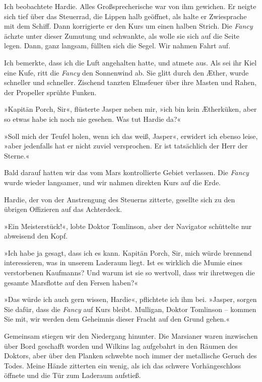 Ich beobachtete Hardie. Alles Großsprecherische war von ihm
gewichen. Er neigte sich tief über das Steuerrad, die Lippen halb
geöffnet, als halte er Zwiesprache mit dem Schiff. Dann korrigierte
er den Kurs um einen halben Strich. Die \emph{Fancy} ächzte unter
dieser Zumutung und schwankte, als wolle sie sich auf die Seite
legen. Dann, ganz langsam, füllten sich die Segel. Wir nahmen Fahrt
auf.

Ich bemerkte, dass ich die Luft angehalten hatte, und atmete aus.
Als sei ihr Kiel eine Kufe, ritt die \emph{Fancy} den Sonnenwind
ab. Sie glitt durch den Æther, wurde schneller und schneller.
Zischend tanzten Elmsfeuer über ihre Masten und Rahen, der
Propeller sprühte Funken.

»Kapitän Porch, Sir«, flüsterte Jasper neben mir, »ich bin kein
Ætherküken, aber so etwas habe ich noch nie gesehen. Was tut Hardie
da?«

»Soll mich der Teufel holen, wenn ich das weiß, Jasper«, erwidert
ich ebenso leise, »aber jedenfalls hat er nicht zuviel versprochen.
Er ist tatsächlich der Herr der Sterne.«

\bigpar

Bald darauf hatten wir das vom Mars kontrollierte Gebiet verlassen.
Die \emph{Fancy} wurde wieder langsamer, und wir nahmen direkten
Kurs auf die Erde.

Hardie, der von der Anstrengung des Steuerns zitterte, gesellte
sich zu den übrigen Offizieren auf das Achterdeck.

»Ein Meisterstück!«, lobte Doktor Tomlinson, aber der Navigator
schüttelte nur abweisend den Kopf.

»Ich habe ja gesagt, dass ich es kann. Kapitän Porch, Sir, mich
würde brennend interessieren, was in unserem Laderaum liegt. Ist es
wirklich die Mumie eines verstorbenen Kaufmanns? Und warum ist sie
so wertvoll, dass wir ihretwegen die gesamte Marsflotte auf den
Fersen haben?«

»Das würde ich auch gern wissen, Hardie«, pflichtete ich ihm bei.
»Jasper, sorgen Sie dafür, dass die \emph{Fancy} auf Kurs bleibt.
Mulligan, Doktor Tomlinson – kommen Sie mit, wir werden dem
Geheimnis dieser Fracht auf den Grund gehen.«

Gemeinsam stiegen wir den Niedergang hinunter. Die Marsianer waren
inzwischen über Bord geschafft worden und Wilkins lag aufgebahrt in
den Räumen des Doktors, aber über den Planken schwebte noch immer
der metallische Geruch des Todes. Meine Hände zitterten ein wenig,
als ich das schwere Vorhängeschloss öffnete und die Tür zum
Laderaum aufstieß.

